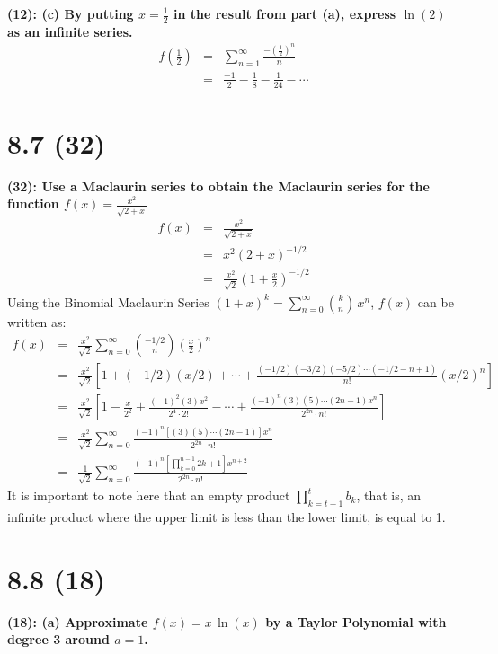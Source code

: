 \documentclass[12]{article}
\begin{document}
\textbf{(12): (c) By putting $x=\frac{1}{2}$ in the result from part (a), express $\ln{(2)}$ as an infinite series.
}
\begin{eqnarray}
f\left(\frac{1}{2}\right) &=& \sum\limits_{n=1}^\infty \frac{-(\frac{1}{2})^n}{n}\\
&=& \frac{-1}{2} - \frac{1}{8} - \frac{1}{24} - \cdots	
\end{eqnarray}


\section{8.7 (32)}
\textbf{(32): Use a Maclaurin series to obtain the Maclaurin series for the function
$\displaystyle{
f(x) = \frac{x^2}{\sqrt{2+x}}
}$}\\
\begin{eqnarray}
f(x) &=& \frac{x^2}{\sqrt{2+x}}\\
&=&x^2(2+x)^{-1/2}\\
&=& \frac{x^2}{\sqrt{2}}(1+\frac{x}{2})^{-1/2}
\end{eqnarray}
Using the Binomial Maclaurin Series $\displaystyle{
(1+x)^k = \sum\limits_{n=0}^\infty \binom{k}{n} \,x^n
}$, $f(x)$ can be written as:
\begin{eqnarray}
f(x) &=& \frac{x^2}{\sqrt{2}}\sum\limits_{n=0}^\infty \binom{-1/2}{n} \left(\frac{x}{2}\right)^n\\
&=& \frac{x^2}{\sqrt{2}}\left[1 + (-1/2)(x/2) +\cdots+ \frac{(-1/2)(-3/2)(-5/2)\cdots(-1/2 - n+1)}{n!}(x/2)^n\right]\\
&=& \frac{x^2}{\sqrt{2}}\left[1 - \frac{x}{2^2} + \frac{(-1)^2(3)x^2}{2^4\cdot 2!}-\cdots+\frac{(-1)^n(3)(5)\cdots(2n-1)x^n}{2^{2n}\cdot n!}\right]\\
&=& \frac{x^2}{\sqrt{2}} \sum\limits_{n=0}^\infty \frac{(-1)^{n}[(3)(5)\cdots(2n-1)]x^{n}}{2^{2n}\cdot n!}\\
&=& \frac{1}{\sqrt{2}}\sum\limits_{n=0}^\infty \frac{(-1)^{n} \left[\prod\limits_{k=0}^{n-1} 2k+1 \right]x^{n+2}}{2^{2n}\cdot n!}
\end{eqnarray}
It is important to note here that an empty product 
$\displaystyle{
\prod\limits_{k=t+1}^t b_k
}$, that is, an infinite product where the upper limit is less than the lower limit, is equal to 1.

\section{8.8 (18)}
\textbf{ (18): (a) Approximate $f(x)=x\,\ln{(x)}$ by a Taylor Polynomial with degree 3 around $a=1$.
}\\
\end{document}
